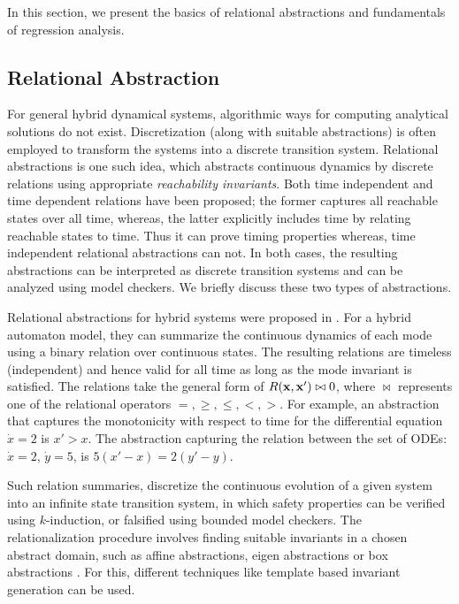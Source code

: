 In this section, we present the basics of relational abstractions and
fundamentals of regression analysis.

\subsection{Relational Abstraction}

For general hybrid dynamical systems, algorithmic ways for computing
analytical solutions do not exist. Discretization (along with suitable
abstractions) is often employed to transform the systems into a
discrete transition system. Relational abstractions is one such idea,
which abstracts continuous dynamics by discrete relations using
appropriate \textit{reachability invariants}. Both time independent
and time dependent relations have been proposed; the former captures
all reachable states over all time, whereas, the latter explicitly
includes time by relating reachable states to time. Thus it
can prove timing properties whereas, time independent relational
abstractions can not. In both cases, the resulting abstractions can be
interpreted as discrete transition systems and can be analyzed using
model checkers. We briefly discuss these two types of abstractions.


Relational abstractions for hybrid systems were proposed in
\cite{Sankaranarayanan+Tiwari/2011/Relational}. For a hybrid automaton
model, they can summarize the continuous dynamics of each mode using a
binary relation over continuous states. The resulting relations are
timeless (independent) and hence valid for all time as long as
the mode invariant is satisfied. The relations take the general form
of $R(\mathbf{x},\mathbf{x}') \bowtie 0$, where $\bowtie$ represents one of the
relational operators $=, \ge, \le, <, >$. For example, an abstraction
that captures the monotonicity with respect to time for the
differential equation $\dot{x} = 2$ is $x' > x$. The abstraction
capturing the relation between the set of ODEs: $\dot{x} = 2$,
$\dot{y} = 5$, is $5(x' - x) = 2(y' - y)$.

Such relation summaries, discretize the continuous evolution of a
given system into an infinite state transition system, in which safety
properties can be verified using $k$-induction, or falsified using
bounded model checkers. The relationalization procedure involves
finding suitable invariants in a chosen abstract domain, such as
affine abstractions, eigen abstractions or box abstractions
\cite{Sankaranarayanan+Tiwari/2011/Relational}.  For this, different
techniques like template based invariant generation
\cite{Gulwani+Tiwari/2008/Constraint,
Colon+Sankaranarayanan+Sipma/03/Linear} can be used.

